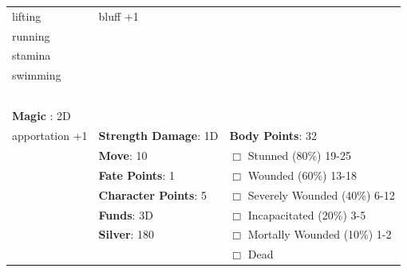 \documentclass[10pt]{article}
\begin{document}
\begin{table}
\begin{tabular}{m{156pt} m{156pt} m{156pt}}
lifting              \hrulefill & bluff             +1 \hrulefill &  \hrulefill \\

running              \hrulefill &  \hrulefill &  \hrulefill \\

stamina              \hrulefill &  \hrulefill &  \hrulefill \\

swimming             \hrulefill &  \hrulefill &  \hrulefill \\

 \hrulefill &  \hrulefill &  \hrulefill \\

 \hrulefill &  \hrulefill &  \hrulefill \\

 \hrulefill &  \hrulefill &  \hrulefill \\

 \hrulefill &  \hrulefill &  \hrulefill \\

                                  &                                 &                             \\
\textbf{Magic }: 2D \hrulefill  &                                 &                             \\
apportation       +1 \hrulefill & \textbf{Strength Damage}: 1D \hrulefill                             & \textbf{Body Points}: 32 \hrulefill \\
 \hrulefill                        & \textbf{Move}:             10             \hrulefill    & $\Box$ Stunned \footnotesize{(80\%)} \hfill 19-25 \\
 \hrulefill                        & \textbf{Fate Points}:      1      \hrulefill    & $\Box$ Wounded \footnotesize{(60\%)} \hfill 13-18 \\
 \hrulefill                        & \textbf{Character Points}: 5 \hrulefill    & $\Box$ Severely Wounded \footnotesize{(40\%)} \hfill 6-12 \\
 \hrulefill                        & \textbf{Funds}:            3D            \hrulefill    & $\Box$ Incapacitated \footnotesize{(20\%)} \hfill 3-5 \\
 \hrulefill                        & \textbf{Silver}:           180           \hrulefill    & $\Box$ Mortally Wounded \footnotesize{(10\%)} \hfill 1-2 \\
 \hrulefill                        &  \hrulefill                                                       & $\Box$ Dead   \\
\end{tabular}
\end{table}
\cleardoublepage
\end{document}
